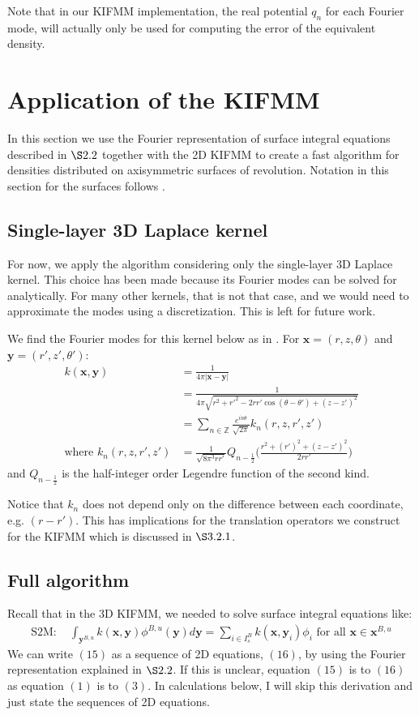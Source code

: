 \documentclass[12pt,letterpaper]{article}
\begin{document}
Note that in our KIFMM implementation, the real potential $q_n$ for each Fourier mode, will actually only be used for computing the error of the equivalent density.

\section{Application of the KIFMM}
In this section we use the Fourier representation of surface integral equations described in $\S2.2$ together with the 2D KIFMM to create a fast algorithm for densities distributed on axisymmetric surfaces of revolution. Notation in this section for the surfaces follows \cite{YBZ}.

\subsection{Single-layer 3D Laplace kernel}
For now, we apply the algorithm considering only the single-layer 3D Laplace kernel. This choice has been made because its Fourier modes can be solved for analytically. For many other kernels, that is not that case, and we would need to approximate the modes using a discretization. This is left for future work.

We find the Fourier modes for this kernel below as in \cite{YYM}. For $\mathbf{x}=(r,z,\theta)$ and $\mathbf{y}=(r',z',\theta')$:
\begin{align}
k(\mathbf{x},\mathbf{y})&=\frac{1}{4\pi |\mathbf{x}-\mathbf{y}|}\\
&=\frac{1}{4\pi\sqrt{r^2+r'^2-2rr'\cos{(\theta-\theta')}+(z-z')^2}}\\
&=\sum_{n\in\mathbb{Z}}\frac{e^{in\theta}}{\sqrt{2\pi}}k_n(r,z,r',z')\\
\mbox{where }k_n(r,z,r',z')&=\frac{1}{\sqrt{8\pi^3rr'}}Q_{n-\frac{1}{2}}\bigg(\frac{r^2+(r')^2+(z-z')^2}{2rr'}\bigg)
\end{align}
and $Q_{n-\frac{1}{2}}$ is the half-integer order Legendre function of the second kind.

Notice that $k_n$ does not depend only on the difference between each coordinate, e.g. $(r-r')$. This has implications for the translation operators we construct for the KIFMM which is discussed in $\S3.2.1$.

\subsection{Full algorithm}
Recall that in the 3D KIFMM, we needed to solve surface integral equations like:
\begin{align}
\mbox{S2M: }&\int_{\mathbf{y}^{B,u}}{k(\mathbf{x},\mathbf{y})}\phi^{B,u}{(\mathbf{y})}d\mathbf{y}=\sum\limits_{i\in I_s^B} k(\mathbf{x},\mathbf{y}_i)\phi_i\mbox{ for all }\mathbf{x}\in\mathbf{x}^{B,u}
\end{align}
We can write $(15)$ as a sequence of 2D equations, $(16)$, by using the Fourier representation explained in $\S2.2$. If this is unclear, equation $(15)$ is to $(16)$ as equation $(1)$ is to $(3)$. In calculations below, I will skip this derivation and just state the sequences of 2D equations.
\end{document}
